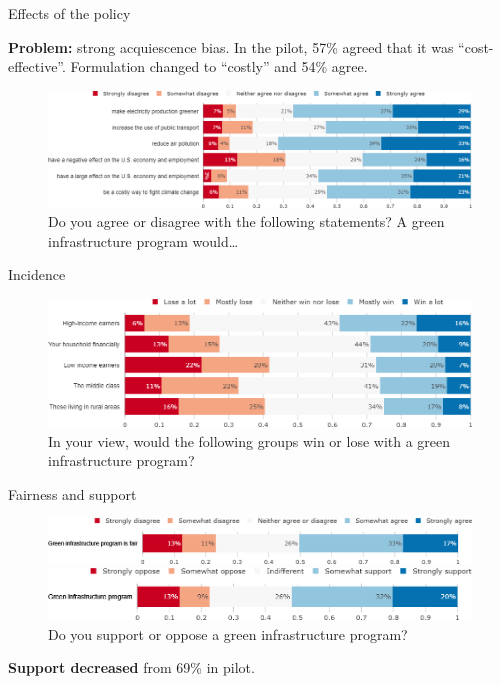 \documentclass[aspectratio=169,9pt,dvipsnames]{beamer}
\begin{document}
\begin{frame}{Effects of the policy}%

\textbf{Problem:} strong acquiescence bias. In the pilot, 57\% agreed that it was ``cost-effective''. Formulation changed to ``costly'' and 54\% agree.

\begin{figure}[h!]
\centering
\caption{Do you agree or disagree with the following statements? A green infrastructure program would…}
\includegraphics[width=\textwidth]{../figures/US/investments_effect_US.png}
\end{figure}
\end{frame}

\begin{frame}{Incidence}%
\begin{figure}[h!]
\centering
\caption{In your view, would the following groups win or lose with a green infrastructure program?}
\includegraphics[width=\textwidth]{../figures/US/investments_win_lose_US.png}
\end{figure}
\end{frame}

\begin{frame}{Fairness and support}%
\begin{figure}[h!]
\centering
\caption{Do you agree or disagree with the following statement: ``A green infrastructure program mainly financed by public debt is fair."}
\includegraphics[width=\textwidth]{../figures/US/investments_fair_US.png}
\vspace{.5cm}
\centering
\caption{Do you support or oppose a green infrastructure program?}
\includegraphics[width=\textwidth]{../figures/US/investments_support_US.png}
\end{figure}


\textbf{Support decreased} from 69\% in pilot.
\end{frame}
\end{document}
